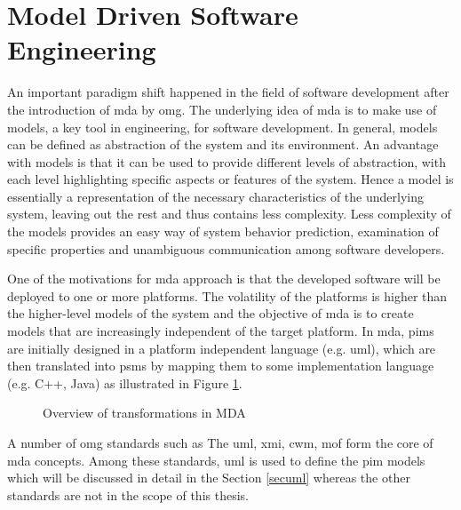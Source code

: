 \section{Model Driven Software Engineering}
An important paradigm shift happened in the field of software development after the introduction of \gls{mda} by \gls{omg}.   The underlying idea of \gls{mda} is to make use of models, a key tool in engineering, for software development. In general, models can be defined as abstraction of the system and its environment. An advantage with models is that it can be used to provide different levels of abstraction, with each level highlighting specific aspects or features of the system. Hence a model is essentially a representation of the necessary characteristics of the underlying system, leaving out the rest and thus contains less complexity. Less complexity of the models provides an easy way of system behavior prediction, examination of specific properties and unambiguous communication among software developers.

One of the motivations for \gls{mda} approach is that the developed software will be deployed to one or more platforms. The volatility of the platforms is higher than the higher-level models of the system and the objective of \gls{mda} is to create models that are increasingly independent of the target platform. In \gls{mda}, \glspl{pim} are initially designed in a platform independent language (e.g. \gls{uml}), which are then translated into \glspl{psm} by mapping them to some implementation language (e.g. C++, Java) as illustrated in Figure \ref{fig:Overview_MDA}.

\begin{figure}[htb!]
\centering
{}
\caption{Overview of transformations in MDA \cite{cerny2015separation}}
\label{fig:Overview_MDA}
\end{figure}

A number of \gls{omg} standards such as The \gls{uml}, \gls{xmi}, \gls{cwm}, \gls{mof} form the core of \gls{mda} concepts. Among these standards, \gls{uml} is used to define the \gls{pim} models which will be discussed in detail in the Section \ref{secuml} whereas the other standards are not in the scope of this thesis.


